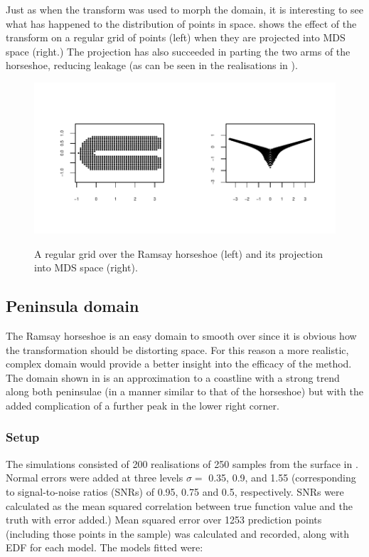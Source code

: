 Just as when the \sch transform was used to morph the domain, it is interesting to see what has happened to the distribution of points in space.  shows the effect of the transform on a regular grid of points (left) when they are projected into MDS space (right.) The projection has also succeeded in parting the two arms of the horseshoe, reducing leakage (as can be seen in the realisations in ).

\begin{figure}
\centering
\includegraphics[width=6in,trim=0.5in 0.5in 0in 0.5in]{mds/figs/mdsrampoints.pdf} \\
\caption{A regular grid over the Ramsay horseshoe (left) and its projection into MDS space (right).}
\label{mdsrampoints}
\end{figure}


\subsection{Peninsula domain}

The Ramsay horseshoe is an easy domain to smooth over since it is obvious how the transformation should be distorting space. For this reason a more realistic, complex domain would provide a better insight into the efficacy of the method. The domain shown in  is an approximation to a coastline with a strong trend along both peninsulae (in a manner similar to that of the horseshoe) but with the added complication of a further peak in the lower right corner.

\subsubsection{Setup}

The simulations consisted of 200 realisations of 250 samples from the surface in . Normal errors were added at three levels $\sigma=$ 0.35, 0.9, and 1.55 (corresponding to signal-to-noise ratios (SNRs) of 0.95, 0.75 and 0.5, respectively. SNRs were calculated as the mean squared correlation between true function value and the truth with error added.) Mean squared error over 1253 prediction points (including those points in the sample) was calculated and recorded, along with EDF for each model. The models fitted were:

